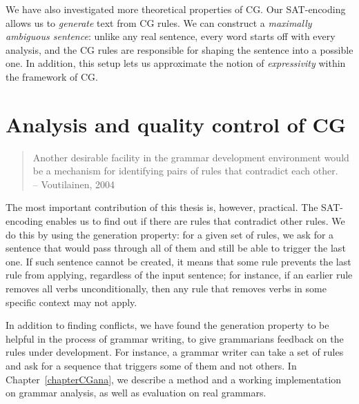 We have also investigated more theoretical properties of CG.
Our SAT-encoding allows us to \emph{generate} text from CG rules.
We can construct a \emph{maximally ambiguous sentence}: unlike any real sentence, 
every word starts off with every analysis, and the CG rules are responsible for shaping the sentence into a possible one. 
In addition, this setup lets us approximate the notion of \emph{expressivity} within the framework of CG.



\section{Analysis and quality control of CG}

\begin{quote}
Another desirable facility in the grammar development environment would be a mechanism for identifying pairs of rules that contradict each other. \\
-- Voutilainen, 2004 \cite{voutilainen2004}
\end{quote}

The most important contribution of this thesis is, however, practical. 
The SAT-encoding enables us to find out if there are rules that contradict other rules. 
We do this by using the generation property: for a given set of rules, we ask for a sentence that would pass through all of them and still be able to trigger the last one. 
If such sentence cannot be created, it means that some rule prevents the last rule from applying, regardless of the input sentence; for instance, if an earlier rule removes all verbs unconditionally, then any rule that removes verbs in some specific context may not apply. 

In addition to finding conflicts, we have found the generation property to be helpful in the process of grammar writing, 
to give grammarians feedback on the rules under development.
For instance, a grammar writer can take a set of rules and ask for a sequence that triggers some of them and not others.
In Chapter~\ref{chapterCGana}, we describe a method and a working 
implementation on grammar analysis, as well as evaluation on real grammars. 







